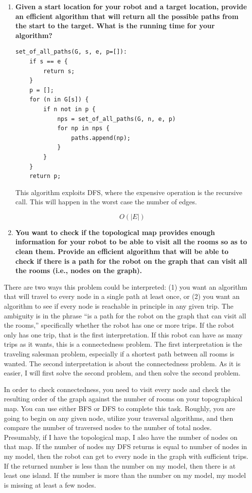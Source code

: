 \documentclass[11pt]{article}
\begin{document}
\begin{enumerate}[label=\Alph*.]

\item \textbf{Given a start location for your robot and a target
location, provide an efficient algorithm that will return all the
possible paths from the start to the target.  What is the running time
for your algorithm?}

\begin{verbatim}
set_of_all_paths(G, s, e, p=[]):
    if s == e {
        return s;
    }
    p = [];
    for (n in G[s]) {
        if n not in p {
            nps = set_of_all_paths(G, n, e, p)
            for np in nps {
                paths.append(np);
            }
        }
    }
    return p; 
\end{verbatim}

This algorithm exploits DFS, where the expensive operation is the recursive
call. This will happen in the worst case the number of edges.

$$O(|E|)$$

\item \textbf{You want to check if the topological map provides
enough information for your robot to be able to visit all the rooms so
as to clean them. Provide an efficient algorithm that will be able to
check if there is a path for the robot on the graph that can visit all
the rooms (i.e., nodes on the graph).}
\end{enumerate}

There are two ways this problem could be interpreted: (1) you want an algorithm
that will travel to every node in a single path at least once, or (2) you want
an algorithm to see if every node is reachable in principle in any given trip.
The ambiguity is in the phrase ``is a path for the robot on the graph that can 
visit all the rooms,'' specifically whether the robot has one or more trips.
If the robot only has one trip, that is the first interpretation. If this
robot can have as many trips as it wants, this is a connectedness problem.
The first interpretation is the traveling salesman problem, especially if a
shortest path between all rooms is wanted. The second interpretation is about
the connectedness problem. As it is easier, I will first solve the second 
problem, and then solve the second problem. 

In order to check connectedness, you need to visit every node and check the
resulting order of the graph against the number of rooms on your topographical
map.
You can use either BFS or DFS to complete this task. Roughly, you are going
to begin on any given node, utilize your traversal algorithms, and then compare
the number of traversed nodes to the number of total nodes. Presumably, if I have
the topological map, I also have the number of nodes on that map. If the number
of nodes my DFS returns is equal to number of nodes in my model, then the robot
can get to every node in the graph with sufficient trips. 
If the returned number is less than the number on my
model, then there is at least one island. If the number is more than the number
on my model, my model is missing at least a few nodes.
\end{document}
